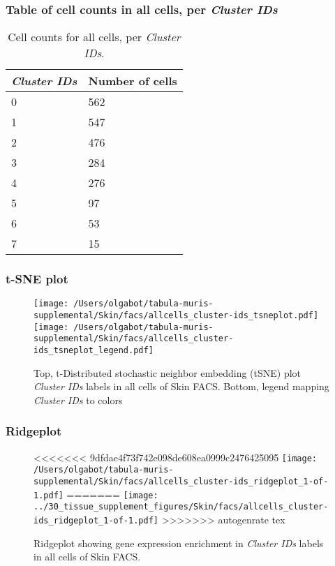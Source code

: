 \subsubsection{Table of cell counts in all cells, per \emph{Cluster IDs}}\begin{table}[h]
\centering
\label{my-label}
\begin{tabular}{@{}ll@{}}
\toprule

\emph{Cluster IDs}& Number of cells \\ \midrule
0 & 562 \\

1 & 547 \\

2 & 476 \\

3 & 284 \\

4 & 276 \\

5 & 97 \\

6 & 53 \\

7 & 15 \\
\bottomrule
\end{tabular}
\caption{Cell counts for all cells, per \emph{Cluster IDs}.}
\end{table}

\clearpage
\subsubsection{t-SNE plot}
\begin{figure}[h]
\centering
\texttt{[image: /Users/olgabot/tabula-muris-supplemental/Skin/facs/allcells\_cluster-ids\_tsneplot.pdf]}
\texttt{[image: /Users/olgabot/tabula-muris-supplemental/Skin/facs/allcells\_cluster-ids\_tsneplot\_legend.pdf]}
\caption{Top, t-Distributed stochastic neighbor embedding (tSNE) plot  \emph{Cluster IDs} labels in all cells of Skin FACS. Bottom, legend mapping \emph{Cluster IDs} to colors}
\end{figure}


\clearpage

\subsubsection{Ridgeplot}
\begin{figure}[h]
\centering
<<<<<<< 9dfdae4f73f742e098de608ea0999c2476425095
\texttt{[image: /Users/olgabot/tabula-muris-supplemental/Skin/facs/allcells\_cluster-ids\_ridgeplot\_1-of-1.pdf]}
=======
\texttt{[image: ../30\_tissue\_supplement\_figures/Skin/facs/allcells\_cluster-ids\_ridgeplot\_1-of-1.pdf]}
>>>>>>> autogenrate tex

\caption{ Ridgeplot  showing gene expression enrichment in \emph{Cluster IDs} labels in all cells of Skin FACS. }
\end{figure}


